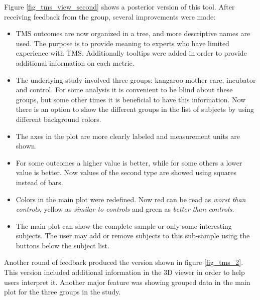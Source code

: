 Figure \ref{fig_tms_view_second} shows a posterior version of this tool. After receiving feedback from the group, several improvements were made:
\begin{itemize}
	\item TMS outcomes are now organized in a tree, and more descriptive names are used. The purpose is to provide meaning to experts who have limited experience with TMS. Additionally tooltips were added in order to provide additional information on each metric.
	\item The underlying study involved three groups: kangaroo mother care, incubator and control. For some analysis it is convenient to be blind about these groups, but some other times it is beneficial to have this information. Now there is an option to show the different groups in the list of subjects by using different background colors.
	\item The axes in the plot are more clearly labeled and measurement units are shown. 
	\item For some outcomes a higher value is better, while for some others a lower value is better. Now values of the second type are showed using squares instead of bars.
	\item Colors in the main plot were redefined. Now red can be read as \emph{worst than controls}, yellow as \emph{similar to controls} and green as \emph{better than controls}.
	\item The main plot can show the complete sample or only some interesting subjects. The user may add or remove subjects to this sub-sample using the buttons below the subject list.
\end{itemize}

Another round of feedback produced the version shown in figure \ref{fig_tms_2}. This version included additional information in the 3D viewer in order to help users interpret it. Another major feature was showing grouped data in the main plot for the three groups in the study.



